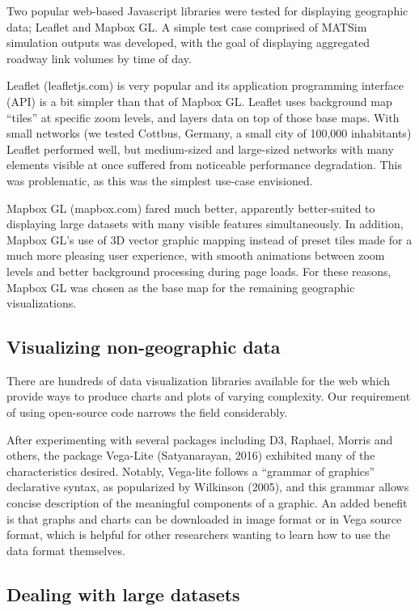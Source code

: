 Two popular web-based Javascript libraries were tested for displaying
geographic data; Leaflet and Mapbox GL. A simple test case comprised of
MATSim simulation outputs was developed, with the goal of displaying
aggregated roadway link volumes by time of day.

Leaflet (leafletjs.com) is very popular and its application programming
interface (API) is a bit simpler than that of Mapbox GL. Leaflet uses
background map ``tiles'' at specific zoom levels, and layers data on top
of those base maps. With small networks (we tested Cottbus, Germany, a
small city of 100,000 inhabitants) Leaflet performed well, but
medium-sized and large-sized networks with many elements visible at once
suffered from noticeable performance degradation. This was problematic,
as this was the simplest use-case envisioned.

Mapbox GL (mapbox.com) fared much better, apparently better-suited to
displaying large datasets with many visible features simultaneously. In
addition, Mapbox GL's use of 3D vector graphic mapping instead of preset
tiles made for a much more pleasing user experience, with smooth
animations between zoom levels and better background processing during
page loads. For these reasons, Mapbox GL was chosen as the base map for
the remaining geographic visualizations.

\hypertarget{visualizing-non-geographic-data}{%
\subsection{Visualizing non-geographic
data}\label{visualizing-non-geographic-data}}

There are hundreds of data visualization libraries available for the web
which provide ways to produce charts and plots of varying complexity.
Our requirement of using open-source code narrows the field
considerably.

After experimenting with several packages including D3, Raphael, Morris
and others, the package Vega-Lite (Satyanarayan, 2016) exhibited many of
the characteristics desired. Notably, Vega-lite follows a ``grammar of
graphics'' declarative syntax, as popularized by Wilkinson (2005), and
this grammar allows concise description of the meaningful components of
a graphic. An added benefit is that graphs and charts can be downloaded
in image format or in Vega source format, which is helpful for other
researchers wanting to learn how to use the data format themselves.

\hypertarget{dealing-with-large-datasets}{%
\subsection{Dealing with large
datasets}\label{dealing-with-large-datasets}}

